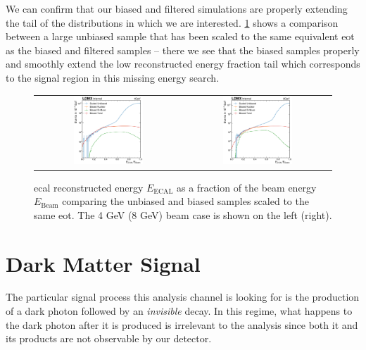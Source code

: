 We can confirm that our biased and filtered simulations are properly extending
the tail of the distributions in which we are interested.
\cref{fig:unbiased-biased-comp} shows a comparison between a large unbiased
sample that has been scaled to the same equivalent \ac{eot} as the biased and
filtered samples -- there we see that the biased samples properly and smoothly
extend the low reconstructed energy fraction tail which corresponds to the
signal region in this missing energy search.

\begin{figure}
  \centering
  \begin{tabular}{cc}
    \includegraphics[width=0.49\textwidth]{figures/ldmx/simulation/unbiased-biased-comp-4gev.pdf}
    &
    \includegraphics[width=0.49\textwidth]{figures/ldmx/simulation/unbiased-biased-comp-8gev.pdf}
  \end{tabular}
  \caption{\ac{ecal} reconstructed energy $E_\text{ECAL}$ as a fraction of the beam energy
  $E_\text{Beam}$ comparing the unbiased and biased samples scaled to the same \ac{eot}.
  The 4 GeV (8 GeV) beam case is shown on the left (right).}
  \label{fig:unbiased-biased-comp}
\end{figure}

\section{Dark Matter Signal}
The particular signal process this analysis channel is looking for is the production of a dark
photon followed by an \emph{invisible} decay. In this regime, what happens to the dark photon after
it is produced is irrelevant to the analysis since both it and its products are not observable by
our detector.

